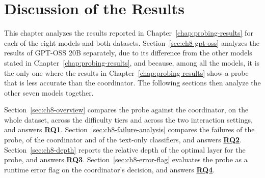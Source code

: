\chapter{Discussion of the Results}
\label{chap:results-analysis}

This chapter analyzes the results reported in Chapter~\ref{chap:probing-results} for each of the eight models and both datasets. Section~\ref{sec:ch8-gpt-oss} analyzes the results of GPT-OSS 20B separately, due to its difference from the other models stated in Chapter~\ref{chap:probing-results}, and because, among all the models, it is the only one where the results in Chapter~\ref{chap:probing-results} show a probe that is less accurate than the coordinator. The following sections then analyze the other seven models together.

Section~\ref{sec:ch8-overview} compares the probe against the coordinator, on the whole dataset, across the difficulty tiers and across the two interaction settings, and answers \hyperref[rq:ch8-rq1-intro]{\textbf{RQ1}}. Section~\ref{sec:ch8-failure-analysis} compares the failures of the probe, of the coordinator and of the text-only classifiers, and answers \hyperref[rq:ch8-rq2-intro]{\textbf{RQ2}}. Section~\ref{sec:ch8-depth} reports the relative depth of the optimal layer for the probe, and answers \hyperref[rq:ch8-rq3-intro]{\textbf{RQ3}}. Section~\ref{sec:ch8-error-flag} evaluates the probe as a runtime error flag on the coordinator's decision, and answers \hyperref[rq:ch8-rq4-intro]{\textbf{RQ4}}.

\raggedbottom











\flushbottom
